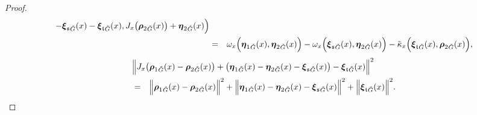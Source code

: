 \documentclass[12pt,a4paper]{article}
\theoremstyle{plain}
\theoremstyle{definition}
\begin{document}
\begin{proof}
\begin{eqnarray*}
{%
-{\boldsymbol{\xi}_{\mathfrak{s}}}_{\tilde{G}}(x)
%
-{\boldsymbol{\xi}_{\mathfrak{t}}}_{\tilde{G}}(x) ,
J_x\big({\boldsymbol{\rho}_2}_{\tilde{G}}(x)\big)
+{\boldsymbol{\eta}_2}_{\tilde{G}}(x)  
\Big)}\nonumber\\
&=&\omega_x\Big(
{\boldsymbol{\eta}_1}_{\tilde{G}}(x)
%
,
{\boldsymbol{\eta}_2}_{\tilde{G}}(x)  
\Big)-\omega_x\Big( {\boldsymbol{\xi}_{\mathfrak{s}}}_{\tilde{G}}(x),{\boldsymbol{\eta}_2}_{\tilde{G}}(x)  \Big)
-\tilde{\kappa}_x\Big({\boldsymbol{\xi}_{\mathfrak{t}}}_{\tilde{G}}(x) ,
{\boldsymbol{\rho}_2}_{\tilde{G}}(x)   \Big),
\nonumber
\end{eqnarray*}
\begin{eqnarray*}
\lefteqn{
\Big\|
J_x\big({\boldsymbol{\rho}_1}_{\tilde{G}}(x)-{\boldsymbol{\rho}_2}_{\tilde{G}}(x)\big)
+\big({\boldsymbol{\eta}_1}_{\tilde{G}}(x)
-{\boldsymbol{\eta}_2}_{\tilde{G}}(x)-{\boldsymbol{\xi}_{\mathfrak{s}}}_{\tilde{G}}(x)\big)
%
-{\boldsymbol{\xi}_{\mathfrak{t}}}_{\tilde{G}}(x)
%
% 
\Big\|^2
}\\
&=&\Big\|
{\boldsymbol{\rho}_1}_{\tilde{G}}(x)-{\boldsymbol{\rho}_2}_{\tilde{G}}(x)\Big\|^2
+\Big\|{\boldsymbol{\eta}_1}_{\tilde{G}}(x)
-{\boldsymbol{\eta}_2}_{\tilde{G}}(x)-{\boldsymbol{\xi}_{\mathfrak{s}}}_{\tilde{G}}(x)\Big\|^2
%
+\Big\|{\boldsymbol{\xi}_{\mathfrak{t}}}_{\tilde{G}}(x)
%
% 
\Big\|^2.
\end{eqnarray*}


\end{proof}
\end{document}
